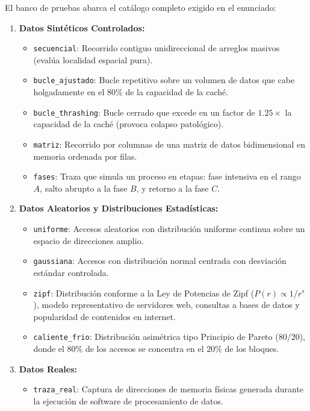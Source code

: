 \documentclass[11pt,letterpaper]{article}
\begin{document}
El banco de pruebas abarca el catálogo completo exigido en el enunciado:
\begin{enumerate}
    \item \textbf{Datos Sintéticos Controlados:}
    \begin{itemize}
        \item \texttt{secuencial}: Recorrido contiguo unidireccional de arreglos masivos (evalúa localidad espacial pura).
        \item \texttt{bucle\_ajustado}: Bucle repetitivo sobre un volumen de datos que cabe holgadamente en el $80\%$ de la capacidad de la caché.
        \item \texttt{bucle\_thrashing}: Bucle cerrado que excede en un factor de $1.25\times$ la capacidad de la caché (provoca colapso patológico).
        \item \texttt{matriz}: Recorrido por columnas de una matriz de datos bidimensional en memoria ordenada por filas.
        \item \texttt{fases}: Traza que simula un proceso en etapas: fase intensiva en el rango $A$, salto abrupto a la fase $B$, y retorno a la fase $C$.
    \end{itemize}
    \item \textbf{Datos Aleatorios y Distribuciones Estadísticas:}
    \begin{itemize}
        \item \texttt{uniforme}: Accesos aleatorios con distribución uniforme continua sobre un espacio de direcciones amplio.
        \item \texttt{gaussiana}: Accesos con distribución normal centrada con desviación estándar controlada.
        \item \texttt{zipf}: Distribución conforme a la Ley de Potencias de Zipf ($P(r) \propto 1/r^s$), modelo representativo de servidores web, consultas a bases de datos y popularidad de contenidos en internet.
        \item \texttt{caliente\_frio}: Distribución asimétrica tipo Principio de Pareto ($80/20$), donde el $80\%$ de los accesos se concentra en el $20\%$ de los bloques.
    \end{itemize}
    \item \textbf{Datos Reales:}
    \begin{itemize}
        \item \texttt{traza\_real}: Captura de direcciones de memoria físicas generada durante la ejecución de software de procesamiento de datos.
    \end{itemize}
\end{enumerate}
\end{document}
